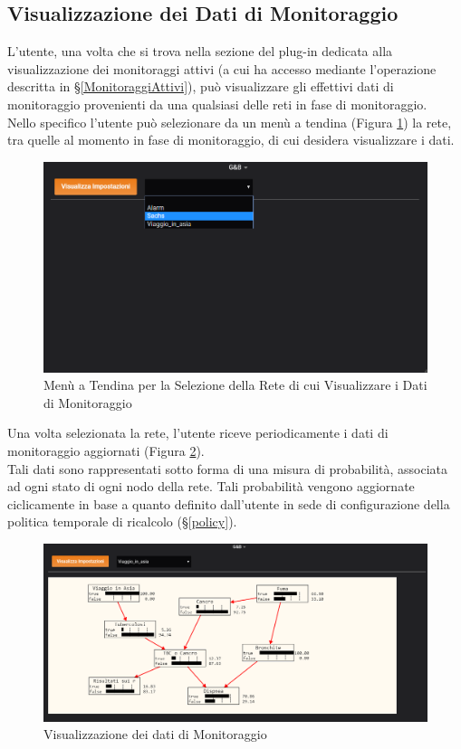\subsection{Visualizzazione dei Dati di Monitoraggio}\label{VisualDati}

L'utente, una volta che si trova nella sezione del plug-in dedicata alla visualizzazione dei monitoraggi attivi (a cui ha accesso mediante l'operazione descritta in §\ref{MonitoraggiAttivi}), può visualizzare gli effettivi dati di monitoraggio provenienti da una qualsiasi delle reti in fase di monitoraggio.\\
Nello specifico l'utente può selezionare da un menù a tendina (Figura \ref{SelezioneMonitoraggio}) la rete, tra quelle al momento in fase di monitoraggio, di cui desidera visualizzare i dati.

\begin{figure}[H]
	\begin{center}
		\includegraphics[scale=0.7]{./images/SelezioneMonitoraggio.png}
		 \caption{Menù a Tendina per la Selezione della Rete di cui Visualizzare i Dati di Monitoraggio}	
		 \label{SelezioneMonitoraggio}
	\end{center}
\end{figure}

Una volta selezionata la rete, l'utente riceve periodicamente i dati di monitoraggio aggiornati (Figura \ref{DatiMonitoraggio}).\\
Tali dati sono rappresentati sotto forma di una misura di probabilità, associata ad ogni stato di ogni nodo della rete. Tali probabilità vengono aggiornate ciclicamente in base a quanto definito dall'utente in sede di configurazione della politica temporale di ricalcolo (§\ref{policy}).

\begin{figure}[H]
	\begin{center}
		\includegraphics[scale=0.5]{./images/DatiMonitoraggio.png}
		 \caption{Visualizzazione dei dati di Monitoraggio}	
		 \label{DatiMonitoraggio}
	\end{center}
\end{figure}
